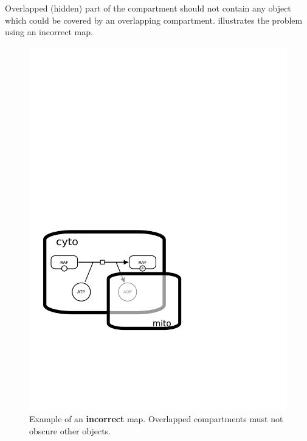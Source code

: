 Overlapped (hidden) part of the compartment should not contain any object which could be covered by an overlapping compartment.   illustrates the problem using an incorrect map.

\begin{figure}[htb]
  \centering
  \includegraphics[scale = 0.45]{examples/compartment_overlapping_wrong}
  \caption{Example of an \textbf{incorrect} map.  Overlapped compartments must not obscure other objects.}
  \label{fig:techref:overlap-bad}
\end{figure}


